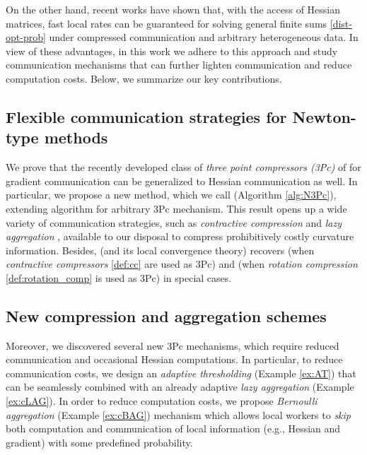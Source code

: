 \documentclass[11pt]{article}
\begin{document}
	On the other hand, recent works \citep{FedNL2021,qian2021basis} have shown that, with the access of Hessian matrices, fast local rates can be guaranteed for solving general finite sums \eqref{dist-opt-prob} under compressed communication and arbitrary heterogeneous data. In view of these advantages, in this work we adhere to this approach and study communication mechanisms that can further lighten communication and reduce computation costs. Below, we summarize our key contributions.
	
	\subsection{Flexible communication strategies for Newton-type methods}
	We prove that the recently developed class of {\em three point compressors (3Pc)} of \citet{richtarik3Pc} for gradient communication can be generalized to Hessian communication as well. In particular, we propose a new method, which we call  (Algorithm \ref{alg:N3Pc}), extending  \citep{FedNL2021} algorithm for arbitrary 3Pc mechanism. This result opens up a wide variety of communication strategies, such as {\em contractive compression} \citep{StichNIPS2018-memory,Alistarh-SparsGradMethods2018,Karimireddy2019EFsignSGD} and {\em lazy aggregation} \citep{chen2018LAG,Sun2019LAG,Ghadikolaei2021LENA}, available to our disposal to compress prohibitively costly curvature information. Besides,  (and its local convergence theory) recovers \citep{FedNL2021} (when {\em contractive compressors} \eqref{def:cc} are used as 3Pc) and  \citep{qian2021basis} (when {\em rotation compression} \eqref{def:rotation_comp} is used as 3Pc) in special cases.
	
	
	\subsection{New compression and aggregation schemes}
	Moreover, we discovered several new 3Pc mechanisms, which require reduced communication and occasional Hessian computations. In particular, to reduce communication costs, we design an {\em adaptive thresholding} (Example \ref{ex:AT}) that can be seamlessly combined with an already adaptive {\em lazy aggregation} (Example \ref{ex:cLAG}). In order to reduce computation costs, we propose {\em Bernoulli aggregation} (Example \ref{ex:cBAG}) mechanism which allows local workers to {\em skip} both computation and communication of local information (e.g., Hessian and gradient) with some predefined probability.
	
\end{document}
